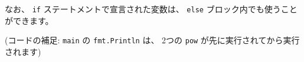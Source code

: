 なお、 \texttt{if} ステートメントで宣言された変数は、
\texttt{else} ブロック内でも使うことができます。

(コードの補足: \texttt{main} の \texttt{fmt.Println} は、
2つの \texttt{pow} が先に実行されてから実行されます)
